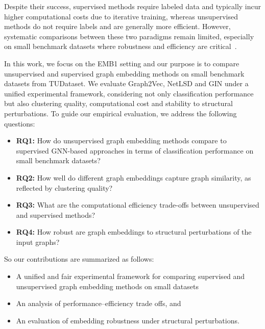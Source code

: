 Despite their success, supervised methods require labeled data 
and typically incur higher computational costs due to iterative training, 
whereas unsupervised methods do not require labels and are generally more efficient. 
However, systematic comparisons between these two paradigms remain limited, especially 
on small benchmark datasets where robustness and efficiency are critical~\cite{errica2019fairgnn,dwivedi2020benchmarking}.

In this work, we focus on the EMB1 setting and our purpose is to compare unsupervised and supervised 
graph embedding methods on small benchmark datasets from TUDataset. 
We evaluate Graph2Vec, NetLSD and GIN under a unified experimental 
framework, considering not only classification performance 
but also clustering quality, computational cost and stability to structural perturbations.
To guide our empirical evaluation, we address the following questions:
\begin{itemize}
    \item \textbf{RQ1:} How do unsupervised graph embedding methods compare to supervised GNN-based approaches in terms of classification performance on small benchmark datasets?
    \item \textbf{RQ2:} How well do different graph embeddings capture graph similarity, as reflected by clustering quality?
    \item \textbf{RQ3:} What are the computational efficiency trade-offs between unsupervised and supervised methods?
    \item \textbf{RQ4:} How robust are graph embeddings to structural perturbations of the input graphs?
\end{itemize}

So our contributions are summarized as follows:
\begin{itemize}
    \item A unified and fair experimental framework for comparing supervised and unsupervised graph embedding methods on small datasets
    \item An analysis of performance–efficiency trade offs, and
    \item An evaluation of embedding robustness under structural perturbations. 
\end{itemize}


